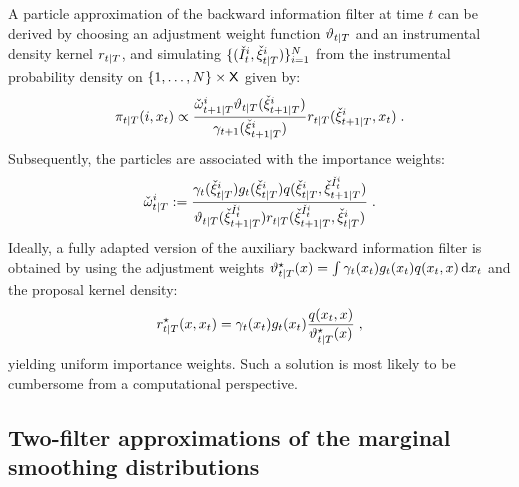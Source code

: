 A particle approximation of the backward information filter at time $t$ can be derived by choosing an adjustment weight function $\adjfunc{t}{T}{}$ and an instrumental density kernel $\kiss{t}{T}$, and simulating $\{ (\check{I}^i_t, {\check{\xi}}_{t|T}^{i}) \}_{i=1}^N$ from
the instrumental probability density on $\{1,\ldots,N\}\times\mathsf{X}$ given by:
\begin{equation}
\label{eq:ebackparticle-update-backward-filtering}
\instrpostaux{t}{T}(i,x_t)\propto  \frac{\ebackwght{t+1}{T}{i} \adjfunc{t}{T}{\ebackpart{t+1}{T}{i}}}{\gamma_{t+1}(\ebackpart{t+1}{T}{i})} \kiss{t}{T}(\ebackpart{t+1}{T}{i},x_t) \eqsp.
\end{equation}
Subsequently, the particles are associated with the importance weights:
\begin{equation}
\label{eq:ebackweight-update-backward-filtering}
\ebackwght{t}{T}{i} \eqdef \frac{\gamma_t(\ebackpart{t}{T}{i}) g_t(\ebackpart{t}{T}{i}) q(\ebackpart{t}{T}{i},\ebackpart{t+1}{T}{\check{I}^i_t})}{\adjfunc{t}{T}{\ebackpart{t+1}{T}{\check{I}^i_t}} \kiss{t}{T}(\ebackpart{t+1}{T}{\check{I}^i_t}, \ebackpart{t}{T}{i})} \eqsp.
\end{equation}
Ideally, a fully adapted version of the auxiliary backward information filter is obtained by using the adjustment weights $\adjfunc[fully]{t}{T}{x}=  \int \gamma_t(x_t) g_t(x_t) q(x_t,x) \, \rmd x_t $ and the proposal kernel density:
\[
\kiss[fully]{t}{T}(x, x_t)=\gamma_t(x_t) g_t(x_t) \frac{q(x_t,x)}{\adjfunc[fully]{t}{T}{x}} \eqsp,
\]
yielding uniform importance weights. Such a solution is most likely to be cumbersome from a computational perspective.

\subsection{Two-filter approximations of the marginal smoothing distributions}
